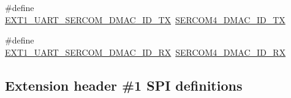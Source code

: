 \begin{DoxyCompactItemize}
\item 
\#define \mbox{\hyperlink{group__samd21__xplained__pro__features__group_gaff51606cf087bc4be8d0386bb075ee23}{E\+X\+T1\+\_\+\+U\+A\+R\+T\+\_\+\+S\+E\+R\+C\+O\+M\+\_\+\+D\+M\+A\+C\+\_\+\+I\+D\+\_\+\+TX}}~\mbox{\hyperlink{sercom4_8h_aeedc76f0fc42937b376b147db4319b37}{S\+E\+R\+C\+O\+M4\+\_\+\+D\+M\+A\+C\+\_\+\+I\+D\+\_\+\+TX}}
\item 
\#define \mbox{\hyperlink{group__samd21__xplained__pro__features__group_ga875a6f3fcbe68f46f4af06292d71cd73}{E\+X\+T1\+\_\+\+U\+A\+R\+T\+\_\+\+S\+E\+R\+C\+O\+M\+\_\+\+D\+M\+A\+C\+\_\+\+I\+D\+\_\+\+RX}}~\mbox{\hyperlink{sercom4_8h_a7de8cf9e95745263a230853b13188522}{S\+E\+R\+C\+O\+M4\+\_\+\+D\+M\+A\+C\+\_\+\+I\+D\+\_\+\+RX}}
\end{DoxyCompactItemize}
\subsection*{Extension header \#1 S\+PI definitions}
